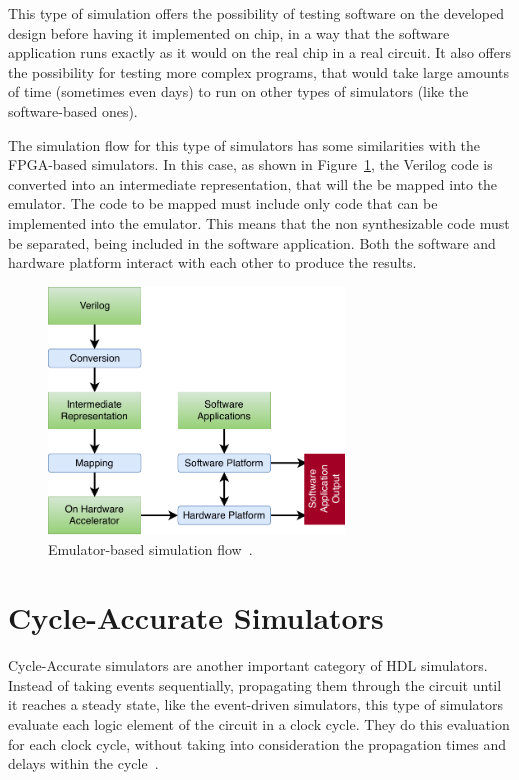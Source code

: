 This type of simulation offers the possibility of testing software on the
developed design before having it implemented on chip, in a way that the
software application runs exactly as it would on the real chip in a real
circuit. It also offers the possibility for testing more complex programs, that
would take large amounts of time (sometimes even days) to run on other types of
simulators (like the software-based ones).

The simulation flow for this type of simulators has some similarities with the
FPGA-based simulators. In this case, as shown in Figure~\ref{fig:emulator}, the
Verilog code is converted into an intermediate representation, that will the be
mapped into the emulator. The code to be mapped must include only code that can
be implemented into the emulator. This means that the non synthesizable code
must be separated, being included in the software application. Both the software
and hardware platform interact with each other to produce the results.

\begin{figure}[!htb]
	\centering
	\includegraphics[width=0.7\textwidth]{Figures/Emulatorsim.pdf}
	\caption{Emulator-based simulation flow~\cite{khandelwal:gatelevel}.}
	\label{fig:emulator}
\end{figure}

\section{Cycle-Accurate Simulators}
\label{section:cycle}

Cycle-Accurate simulators are another important category of HDL
simulators. Instead of taking events sequentially, propagating them through the
circuit until it reaches a steady state, like the event-driven simulators, this
type of simulators evaluate each logic element of the circuit in a clock
cycle. They do this evaluation for each clock cycle, without taking into
consideration the propagation times and delays within the
cycle~\cite{khandelwal:gatelevel}.


